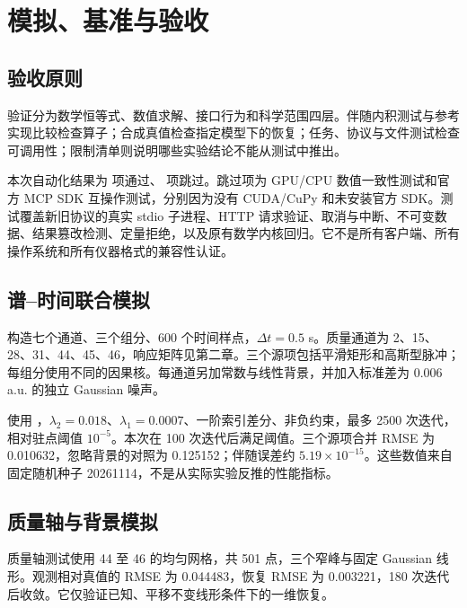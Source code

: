 \chapter{模拟、基准与验收}
\section{验收原则}
验证分为数学恒等式、数值求解、接口行为和科学范围四层。伴随内积测试与参考实现比较检查算子；合成真值检查指定模型下的恢复；任务、协议与文件测试检查可调用性；限制清单则说明哪些实验结论不能从测试中推出。

本次自动化结果为 \TestPassed{} 项通过、\TestSkipped{} 项跳过。跳过项为 GPU/CPU 数值一致性测试和官方 MCP SDK 互操作测试，分别因为没有 CUDA/CuPy 和未安装官方 SDK。测试覆盖新旧协议的真实 stdio 子进程、HTTP 请求验证、取消与中断、不可变数据、结果篡改检测、定量拒绝，以及原有数学内核回归。它不是所有客户端、所有操作系统和所有仪器格式的兼容性认证。

\section{谱--时间联合模拟}
构造七个通道、三个组分、600 个时间样点，$\Delta t=0.5$ s。质量通道为 2、15、28、31、44、45、46，响应矩阵见第二章。三个源项包括平滑矩形和高斯型脉冲；每组分使用不同的因果核。每通道另加常数与线性背景，并加入标准差为 0.006 a.u. 的独立 Gaussian 噪声。

使用 ，$\lambda_2=0.018$、$\lambda_1=0.0007$、一阶索引差分、非负约束，最多 2500 次迭代，相对驻点阈值 $10^{-5}$。本次在 100 次迭代后满足阈值。三个源项合并 RMSE 为 0.010632，忽略背景的对照为 0.125152；伴随误差约 $5.19\times10^{-15}$。这些数值来自固定随机种子 20261114，不是从实际实验反推的性能指标。


\section{质量轴与背景模拟}
质量轴测试使用 44 至 46 的均匀网格，共 501 点，三个窄峰与固定 Gaussian 线形。观测相对真值的 RMSE 为 0.044483，恢复 RMSE 为 0.003221，180 次迭代后收敛。它仅验证已知、平移不变线形条件下的一维恢复。

